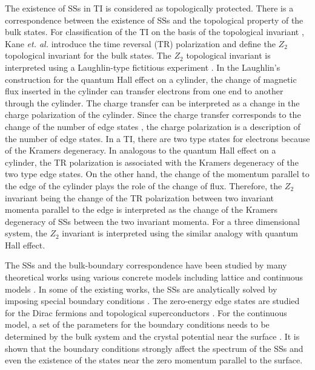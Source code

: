 \documentclass[aps,pra,amsmath,twocolumn,showpacs,bibnotes,10pt]{revtex4-1}
\begin{document}
The existence of SSs in TI is considered as topologically protected. There is a correspondence between the existence of SSs and the topological property of the bulk states. For classification of the TI on the basis of the topological invariant \cite{Thouless1,Thouless}, Kane {\it et. al.} \cite{Kane2,Fu,Fu2,Fu3} introduce the time reversal (TR) polarization and define the $Z_2$ topological invariant for the bulk states. The $Z_2$ topological invariant is interpreted using a Laughlin-type fictitious experiment \cite{Laughlin}. In the Laughlin's construction for the quantum Hall effect on a cylinder, the change of magnetic flux inserted in the cylinder can transfer electrons from one end to another through the cylinder. The charge transfer can be interpreted as a change in the charge polarization of the cylinder. Since the charge transfer corresponds to the change of the number of edge states \cite{Halperin,Hatsugai}, the charge polarization is a description of the number of edge states. In a TI, there are two type states for electrons because of the Kramers degeneracy. In analogous to the quantum Hall effect on a cylinder, the TR polarization is associated with the Kramers degeneracy of the two type edge states. On the other hand, the change of the momentum parallel to the edge of the cylinder plays the role of the change of flux. Therefore, the $Z_2$ invariant being the change of the TR polarization between two invariant momenta parallel to the edge is interpreted as the change of the Kramers degeneracy of SSs between the two invariant momenta. For a three dimensional system, the $Z_2$ invariant is interpreted using the similar analogy with quantum Hall effect.  

The SSs and the bulk-boundary correspondence have been studied by many theoretical works using various concrete models including lattice \cite{Qi2,Hosur,Mong,Isaev,Delplace,Ryu,Pershoguba,Siroki,Zhao} and continuous models \cite{Linder,Liu,Zhang,Enaldiev,Weber}. In some of the existing works, the SSs are analytically solved by imposing special boundary conditions \cite{Isaev,Pershoguba}. The zero-energy edge states are studied for the Dirac fermions and topological superconductors \cite{Mong,Ryu}. For the continuous model, a set of the parameters for the boundary conditions needs to be determined by the bulk system and the crystal potential near the surface \cite{Enaldiev}. It is shown that the boundary conditions strongly affect the spectrum of the SSs and even the existence of the states near the zero momentum parallel to the surface. 
\end{document}
